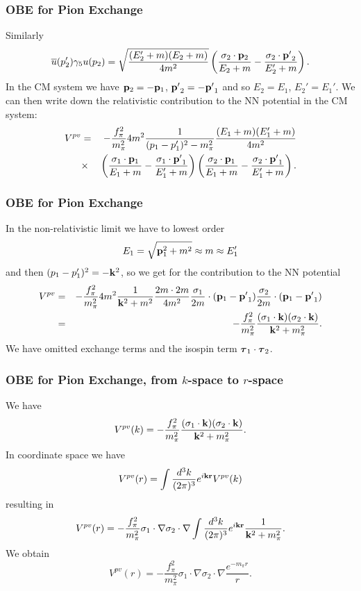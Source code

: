 \documentclass[compress]{beamer}
\begin{document}
\frame
{
\frametitle{OBE for Pion Exchange}
Similarly
\[
\overline{u}(p_{2}')\gamma_{5}u(p_{2})=\sqrt{\frac{(E_{2}'+m)(E_{2}+m)}
{4m^{2}}}\left(\frac{\sigma_{2}\cdot {\bf p}_{2}}{E_{2}+m}-
\frac{\sigma_{2}\cdot{\bf p'}_{2}}{E_{2}'+m}\right).
\]
In the CM system we have ${\bf p}_{2}=-{\bf p}_{1}$, ${\bf p'}_{2}=
-{\bf p'}_{1}$ and so $E_{2}=E_{1}$, $E_{2}'=E_{1}'$.  
We can then write down the relativistic contribution 
to the NN potential in the CM system: 
\begin{eqnarray}
V^{pv}&=&-\frac{f_{\pi}^{2}}{m_{\pi}^{2}}4m^{2}\frac{1}{(p_{1}-p_{1}')^{2}-
m_{\pi}^{2}}\frac{(E_{1}+m)(E_{1}'+m)}{4m^{2}} \nonumber \\ 
 &\times&\left(\frac{\sigma_{1}\cdot{\bf p}_{1}}{E_{1}+m}-\frac{\sigma_{1}
\cdot{\bf p'}_{1}}{E_{1}'+m}\right)\left(\frac{\sigma_{2}\cdot{\bf p}_{1}}
{E_{1}+m}-\frac{\sigma_{2}\cdot{\bf p'}_{1}}{E_{1}'+m}\right). \nonumber
\end{eqnarray}
}



\frame
{
\frametitle{OBE for Pion Exchange}
In the non-relativistic limit we have to lowest order 
\[
E_{1}=\sqrt{{\bf p}_{1}^{2}+m^{2}}\approx m \approx E_{1}'
\]
and then $(p_{1}-p_{1}')^{2}=-{\bf k}^{2}$, so we get 
for the contribution to the NN potential
\begin{eqnarray}
V^{pv}&=&-\frac{f_{\pi}^{2}}{m_{\pi}^{2}}4m^{2}\frac{1}{{\bf k}^{2}+m^{2}}
\frac{2m\cdot 2m}{4m^{2}}\frac{\sigma_{1}}{2m}\cdot({\bf p}_{1}-{\bf p'}_{1})
\frac{\sigma_{2}}{2m}\cdot ({\bf p}_{1}-{\bf p'}_{1}) \nonumber \\ 
 &=&-\frac{f_{\pi}^{2}}{m_{\pi}^{2}}
\frac{(\sigma_{1}\cdot{\bf k})(\sigma_{2}\cdot{\bf k})}{{\bf k}^{2}+m_{\pi}^{2}}.
\nonumber
\end{eqnarray}
We have omitted exchange terms and the isospin term $\mbox{\boldmath $\tau$}_1\cdot\mbox{\boldmath $\tau$}_2$.
}

\frame
{
\frametitle{OBE for Pion Exchange, from $k$-space to $r$-space}
We have
\[
V^{pv}(k)=-\frac{f_{\pi}^{2}}{m_{\pi}^{2}}
\frac{(\sigma_{1}\cdot{\bf k})(\sigma_{2}\cdot{\bf k})}{{\bf k}^{2}+m_{\pi}^{2}}.
\]
In coordinate space we have
\[
V^{pv}(r)=\int\frac{d^3k}{(2\pi)^3}e^{i{\bf kr}}V^{pv}(k)
\]
resulting in
\[
  V^{pv}(r)=-\frac{f_{\pi}^{2}}{m_{\pi}^{2}}
\sigma_{1}\cdot{\nabla}\sigma_{2}\cdot{\nabla}
\int\frac{d^3k}{(2\pi)^3}e^{i{\bf kr}}\frac{1}{{\bf k}^{2}+m_{\pi}^{2}}.
\]
We obtain
\[
V^{pv}(r)=-\frac{f_{\pi}^{2}}{m_{\pi}^{2}}\sigma_{1}\cdot{\nabla}\sigma_{2}\cdot{\nabla}\frac{e^{-m_{\pi}r}}{r}.
\]

}
\end{document}
